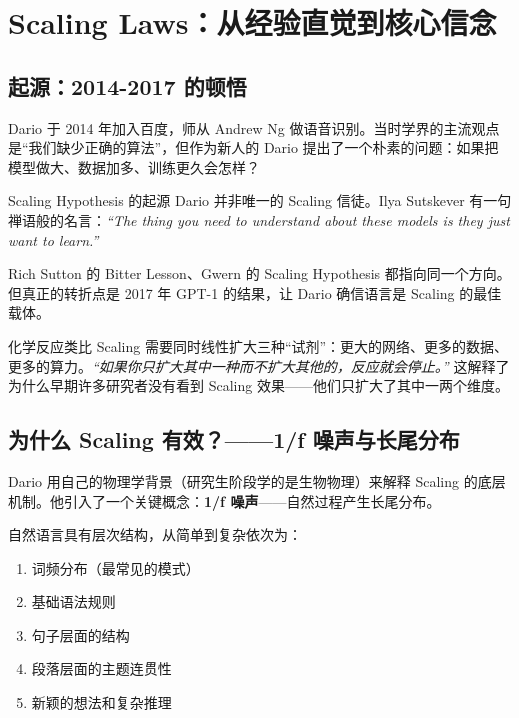 \section{Scaling Laws：从经验直觉到核心信念}

\subsection{起源：2014-2017 的顿悟}

Dario 于 2014 年加入百度，师从 Andrew Ng 做语音识别。当时学界的主流观点是``我们缺少正确的算法''，但作为新人的 Dario 提出了一个朴素的问题：如果把模型做大、数据加多、训练更久会怎样？

\begin{knowledgebox}{Scaling Hypothesis 的起源}
Dario 并非唯一的 Scaling 信徒。Ilya Sutskever 有一句禅语般的名言：\textit{``The thing you need to understand about these models is they just want to learn.''}

Rich Sutton 的 Bitter Lesson、Gwern 的 Scaling Hypothesis 都指向同一个方向。但真正的转折点是 2017 年 GPT-1 的结果，让 Dario 确信语言是 Scaling 的最佳载体。
\end{knowledgebox}

\begin{importantbox}{化学反应类比}
Scaling 需要同时线性扩大三种``试剂''：更大的网络、更多的数据、更多的算力。\textit{``如果你只扩大其中一种而不扩大其他的，反应就会停止。''} 这解释了为什么早期许多研究者没有看到 Scaling 效果——他们只扩大了其中一两个维度。
\end{importantbox}

\subsection{为什么 Scaling 有效？——1/f 噪声与长尾分布}

Dario 用自己的物理学背景（研究生阶段学的是生物物理）来解释 Scaling 的底层机制。他引入了一个关键概念：\textbf{1/f 噪声}——自然过程产生长尾分布。

自然语言具有层次结构，从简单到复杂依次为：
\begin{enumerate}
    \item 词频分布（最常见的模式）
    \item 基础语法规则
    \item 句子层面的结构
    \item 段落层面的主题连贯性
    \item 新颖的想法和复杂推理
\end{enumerate}

